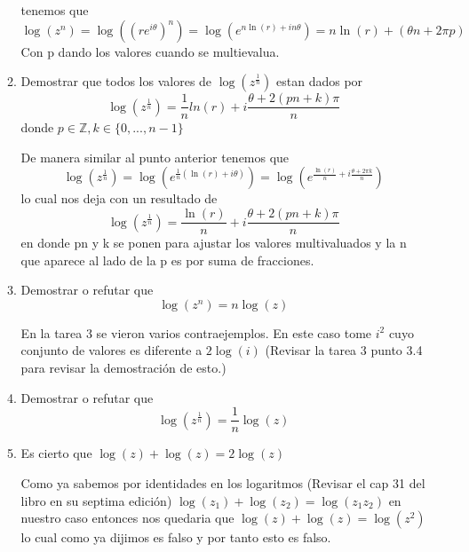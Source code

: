 \documentclass[12pt]{exam}
\begin{document}
\begin{enumerate}
\begin{enumerate}
    tenemos que $$\log(z^n) = \log((re^{i\theta})^n) = \log(e^{n\ln(r)+in\theta}) = n\ln(r) + (\theta n + 2\pi p)$$
    Con p dando los valores cuando se multievalua.
    \item Demostrar que todos los valores de $\log(z^{\frac{1}{n}})$ estan dados por $$\log(z^{\frac{1}{n}})=\frac{1}{n}ln(r) + i \frac{\theta + 2(pn + k)\pi}{n}$$ donde $p \in \mathbb{Z},k \in \{0,...,n-1\}$
    
    De manera similar al punto anterior tenemos que $$\log(z^{\frac{1}{n}})=\log(e^{\frac{1}{n}(\ln(r)+i\theta)})=\log(e^{\frac{\ln(r)}{n}+ i\frac{\theta + 2 \pi k}{n}})$$
    lo cual nos deja con un resultado de $$\log(z^{\frac{1}{n}})= \frac{\ln(r)}{n}+i\frac{\theta + 2(pn + k)\pi}{n}$$
    en donde pn y k se ponen para ajustar los valores multivaluados y la n que aparece al lado de la p es por suma de fracciones.
    \item Demostrar o refutar que $$\log(z^n) = n\log(z)$$
    
    En la tarea 3 se vieron varios contraejemplos. En este caso tome $i^2$ cuyo conjunto de valores es diferente a $2\log(i)$
    (Revisar la tarea 3 punto 3.4 para revisar la demostración de esto.)
    \item Demostrar o refutar que $$\log(z^{\frac{1}{n}})=\frac{1}{n}\log(z)$$
    \item Es cierto que $\log(z) + \log(z) = 2\log(z)$
    
    Como ya sabemos por identidades en los logaritmos (Revisar el cap 31 del libro en su septima edición) $\log(z_1)+\log(z_2) = \log(z_1z_2)$
    en nuestro caso entonces nos quedaria que $\log(z)+\log(z)=\log(z^2)$ lo cual como ya dijimos es falso y por tanto esto es falso.
\end{enumerate}
\end{enumerate}
\end{document}
